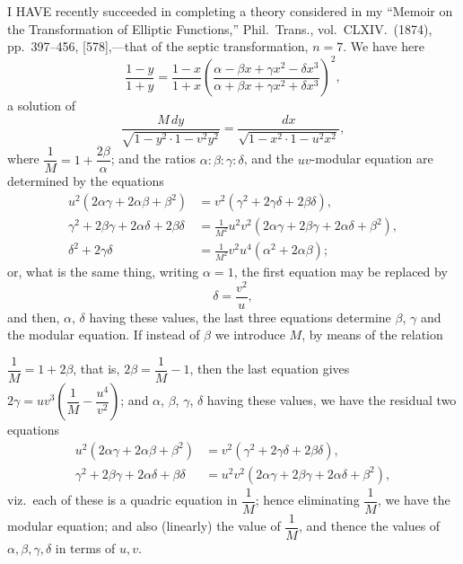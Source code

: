 \documentclass[11pt]{article}
\begin{document}
\medskip

\noindent I HAVE recently succeeded in completing a theory considered in my ``Memoir on the Transformation of Elliptic Functions,'' Phil.\ Trans., vol.\ CLXIV.\ (1874), pp.~397--456, [578],---that of the septic transformation, $n = 7$. We have here
\[
\frac{1 - y}{1 + y} = \frac{1 - x}{1 + x}\left(\frac{\alpha - \beta x + \gamma x^{2} - \delta x^{3}}{\alpha + \beta x + \gamma x^{2} + \delta x^{3}}\right)^{2},
\]
a solution of
\[
\frac{M\,dy}{\sqrt{1 - y^{2}\cdot 1 - v^{2}y^{2}}} = \frac{dx}{\sqrt{1 - x^{2}\cdot 1 - u^{2}x^{2}}},
\]
where $\dfrac{1}{M} = 1 + \dfrac{2\beta}{\alpha}$; and the ratios $\alpha : \beta : \gamma : \delta$, and the $uv$-modular equation are determined by the equations
\begin{align*}
u^{2}(2\alpha\gamma + 2\alpha\beta + \beta^{2}) &= v^{2}(\gamma^{2} + 2\gamma\delta + 2\beta\delta),\\
\gamma^{2} + 2\beta\gamma + 2\alpha\delta + 2\beta\delta &= \tfrac{1}{M^{2}}u^{2}v^{2}(2\alpha\gamma + 2\beta\gamma + 2\alpha\delta + \beta^{2}),\\
\delta^{2} + 2\gamma\delta &= \tfrac{1}{M^{2}}v^{2}u^{4}(\alpha^{2} + 2\alpha\beta);
\end{align*}
or, what is the same thing, writing $\alpha = 1$, the first equation may be replaced by
\[
\delta = \frac{v^{2}}{u},
\]
and then, $\alpha$, $\delta$ having these values, the last three equations determine $\beta$, $\gamma$ and the modular equation. If instead of $\beta$ we introduce $M$, by means of the relation


\noindent $\dfrac{1}{M} = 1 + 2\beta$, that is, $2\beta = \dfrac{1}{M} - 1$, then the last equation gives $2\gamma = uv^{3}\left(\dfrac{1}{M} - \dfrac{u^{4}}{v^{2}}\right)$; and $\alpha$, $\beta$, $\gamma$, $\delta$ having these values, we have the residual two equations
\begin{align*}
u^{2}(2\alpha\gamma + 2\alpha\beta + \beta^{2}) &= v^{2}(\gamma^{2} + 2\gamma\delta + 2\beta\delta),\\
\gamma^{2} + 2\beta\gamma + 2\alpha\delta + \beta\delta &= u^{2}v^{2}(2\alpha\gamma + 2\beta\gamma + 2\alpha\delta + \beta^{2}),
\end{align*}
viz.\ each of these is a quadric equation in $\dfrac{1}{M}$; hence eliminating $\dfrac{1}{M}$, we have the modular equation; and also (linearly) the value of $\dfrac{1}{M}$, and thence the values of $\alpha, \beta, \gamma, \delta$ in terms of $u, v$.
\end{document}
